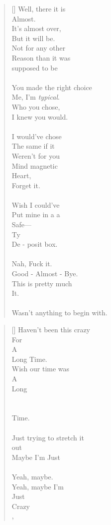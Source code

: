 \documentclass{article}
\begin{document}
\settowidth{\versewidth}{Than Tycho Brahe, or Erra Pater:}
\begin{verse}[\versewidth]
Well, there it is \\
Almost. \\
\tab It's almost over, \\
\tab \tab But it will be. \\
Not for any other \\
Reason than it was \\
supposed to be\\
\\
You made the right choice \\
Me, I'm \textit{typical}. \\
Who you chose, \\ 
I knew you would. \\
\\
I would've chose \\
The same if it \\
Weren't for you \\
Mind magnetic \\
Heart, \\
Forget it. \\
\\
Wish I could've \\
Put mine in a a \\
Safe–– \\
Ty \\
De - posit box. \\
\\
Nah, Fuck it. \\
Good - Almost - Bye. \\
This is pretty much \\
It. \\

\\
Wasn't anything to begin with. \\
\end{verse}

\settowidth{\versewidth}{Than Tycho Brahe, or Erra Pater:}
\begin{verse}[\versewidth]
Haven't been this crazy \\
For \\
A \\
Long \tab \tab \tab Time.
\\
Wish our time was \\
A \\
Long \\
\\
\\
Time. \\
\\
Just trying to stretch it \\
\tab \tab out \\
Maybe I'm Just \\
\\
Yeah, maybe. \\
Yeah, maybe I'm \\
Just \\
Crazy \\
, \\
\end{verse}
\end{document}
